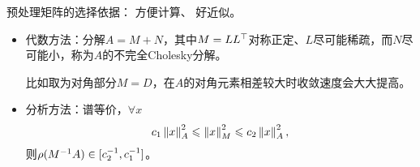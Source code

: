 \begin{remark}
    预处理矩阵的选择依据：
    方便计算、
    好近似。
    \begin{itemize}
        \item 代数方法：分解$A=M+N$，其中$M=LL^\top$对称正定、$L$尽可能稀疏，而$N$尽可能小，称为$A$的不完全Cholesky分解。
        
        比如取为对角部分$M=D$，在$A$的对角元素相差较大时收敛速度会大大提高。
        \item 分析方法：谱等价，$\forall x$
        \[
            c_1\left\lVert x\right\rVert_A^2\leqslant\left\lVert x\right\rVert_M^2\leqslant c_2\left\lVert x\right\rVert_A^2,
        \]
        则$\rho(M^{-1} A)\in[c_2^{-1},c_1^{-1}]$。
    \end{itemize}
\end{remark}